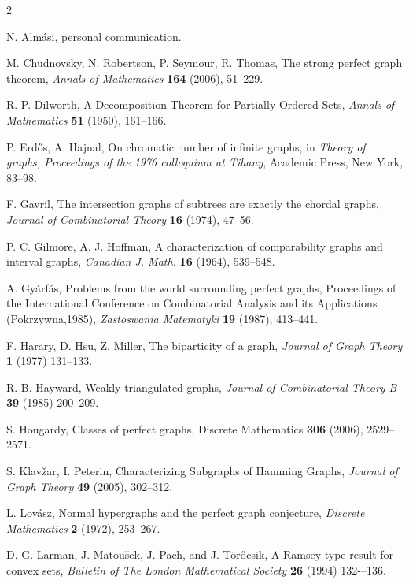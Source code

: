 \documentclass[12pt]{article}
\begin{document}
\begin{thebibliography}{2}


 N. Alm\'asi, personal communication.


 M. Chudnovsky, N. Robertson, P. Seymour, R. Thomas, The strong perfect graph theorem, {\em Annals of Mathematics} {\bf 164} (2006), 51--229.


 R. P.  Dilworth, A Decomposition Theorem for Partially Ordered Sets, {\em Annals of Mathematics} {\bf 51} (1950), 161--166.

 P. Erd\H os, A. Hajnal, On chromatic number of infinite graphs, in {\em Theory of graphs, Proceedings of the 1976 colloquium at Tihany}, Academic Press, New York, 83--98.

 F. Gavril, The intersection graphs of subtrees are exactly the chordal graphs, {\em Journal of Combinatorial Theory} {\bf 16} (1974), 47--56.

 P. C. Gilmore, A. J. Hoffman, A characterization of comparability graphs and interval graphs, {\em Canadian J. Math.} {\bf 16} (1964), 539--548.



 A. Gy\'arf\'as, Problems from the world surrounding perfect graphs, Proceedings of the International Conference on Combinatorial Analysis and its Applications (Pokrzywna,1985), {\em Zastoswania Matematyki} {\bf 19} (1987), 413--441.

 F. Harary, D. Hsu, Z. Miller, The biparticity of a graph, {\em Journal of Graph Theory} {\bf 1} (1977) 131--133.


 R. B. Hayward, Weakly triangulated graphs, {\em Journal of Combinatorial Theory B} {\bf 39} (1985) 200--209.


 S. Hougardy, Classes of perfect graphs, {Discrete Mathematics} {\bf 306} (2006), 2529--2571.

 S. Klav\v zar, I. Peterin, Characterizing Subgraphs of Hamming Graphs, {\em Journal of Graph Theory} {\bf{49}} (2005), 302--312.

 L. Lov\'asz, Normal hypergraphs and the perfect graph conjecture, {\em Discrete Mathematics} {\bf 2} (1972), 253--267.


 D. G. Larman, J. Matoušek, J. Pach, and J. Tör\H ocsik, A Ramsey-type result for convex sets, {\em Bulletin of The London Mathematical Society} {\bf 26} (1994) 132-–136.


\end{thebibliography}
\end{document}
